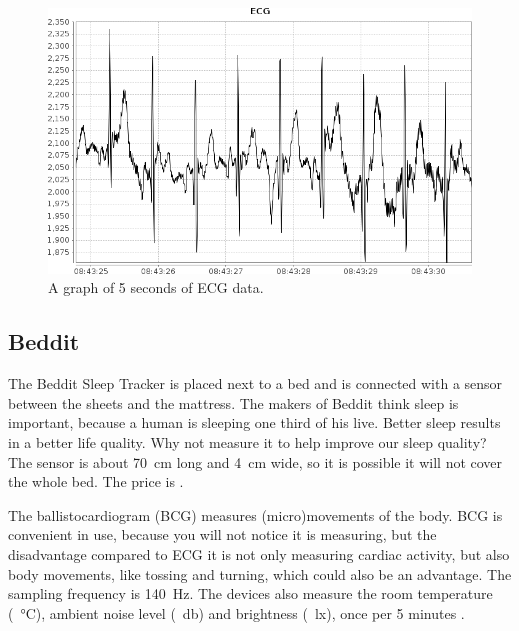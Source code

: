 			\begin{figure}[h]
				\centering
					\includegraphics[scale=0.5]{ecg.png}
					
				\caption{A graph of 5 seconds of ECG data.}
				\label{fig:ecg}

			\end{figure}
			


	\subsection{Beddit}
		The Beddit Sleep Tracker is placed next to a bed and is connected with a sensor between the sheets and the mattress. The makers of Beddit think sleep is important, because a human is sleeping one third of his live. Better sleep results in a better life quality. Why not measure it to help improve our sleep quality? The sensor is about \SI{70}{\centi\metre} long and \SI{4}{\centi\metre} wide, so it is possible it will not cover the whole bed. 
			The price is .

			The ballistocardiogram (BCG) measures (micro)movements of the body. \cite{beddit}
			BCG is convenient in use, because you will not notice it is measuring, but the disadvantage compared to ECG it is not only measuring cardiac activity, but also body movements, like tossing and turning, which could also be an advantage. \cite{bcg} The sampling frequency is \SI{140}{\hertz}. The devices also measure the room temperature (\SI{}{\celsius}), ambient noise level (\SI{}{\decibel}) and brightness (\SI{}{\lux}), once per 5 minutes \cite{bedditapi}.

